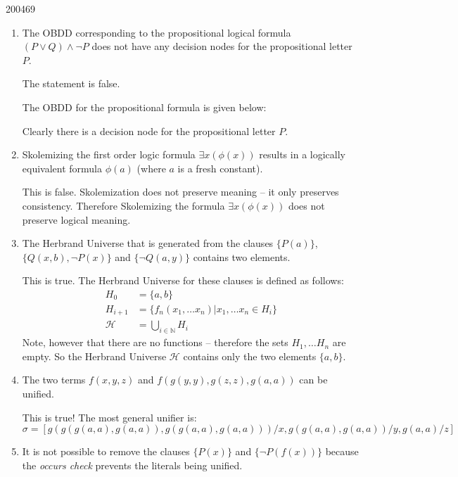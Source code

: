 \documentclass[10pt,\jkfside,a4paper]{article}
\begin{document}
\begin{examquestion}{2004}{6}{9}
\begin{enumerate}
\item The OBDD corresponding to the propositional logical formula
$(P \vee Q) \wedge \neg P$ does not have any decision nodes for the
propositional letter $P$.

The statement is false.

The OBDD for the propositional formula is given below:
\begin{center}
\end{center}
Clearly there is a decision node for the propositional letter $P$.

\item Skolemizing the first order logic formula $\exists x(\phi(x))$ results
in a logically equivalent formula $\phi(a)$ (where $a$ is a fresh constant).

This is false. Skolemization does not preserve meaning -- it only preserves
consistency. Therefore Skolemizing the formula $\exists x(\phi(x))$ does not
preserve logical meaning.

\item The Herbrand Universe that is generated from the clauses $\{P(a)\}$,
$\{Q(x, b), \neg P(x)\}$ and $\{\neg Q(a, y)\}$ contains two elements.

This is true. The Herbrand Universe for these clauses is defined as follows:
\begin{align*}
H_0 &= \{a, b\} \\
H_{i+1} &= \{f_n(x_1, \dots x_n)| x_1, \dots x_n \in H_i\} \\
\mathcal{H} &= \bigcup_{i \in \mathbb{N}} H_i
\end{align*}
Note, however that there are no functions -- therefore the sets $H_1, \dots
H_n$ are empty. So the Herbrand Universe $\mathcal{H}$ contains only the two
elements $\{a, b\}$.

\item The two terms $f(x, y, z)$ and $f(g(y, y), g(z, z), g(a, a))$ can
be unified.

This is true! The most general unifier is:
\[
\sigma = [g(g(g(a, a), g(a, a)), g(g(a, a), g(a, a)))/x, g(g(a, a), g(a, a))/y, g(a, a)/z]
\]

\item It is not possible to remove the clauses $\{P(x)\}$ and
$\{\neg P(f(x))\}$ because the \textit{occurs check} prevents the literals
being unified.


\end{enumerate}
\end{examquestion}
\end{document}
